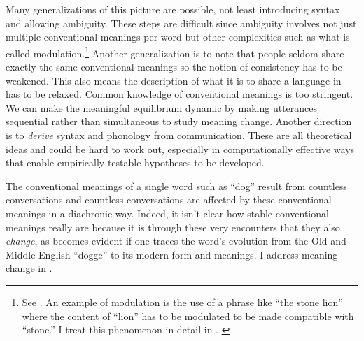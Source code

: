 
Many generalizations of this picture are possible, not least introducing syntax and allowing ambiguity. These steps are difficult since ambiguity involves not just multiple conventional meanings per word but other complexities such as what is called modulation.\footnote{See \citet{cohen:pa, cohen:ci}. An example of modulation is the use of a phrase like ``the stone lion'' where the content of ``lion'' has to be modulated to be made compatible with ``stone.'' I treat this phenomenon in detail in . \label{foot:modulation}} Another generalization is to note that people seldom share exactly the same conventional meanings so the notion of consistency has to be weakened. This also means the description of what it is to share a language in  has to be relaxed. Common knowledge of conventional meanings is too stringent. We can make the meaningful equilibrium dynamic by making utterances sequential rather than simultaneous to study meaning change. Another direction is to \emph{derive} syntax and phonology from communication. These are all theoretical ideas and could be hard to work out, especially in computationally effective ways that enable empirically testable hypotheses to be developed.

The conventional meanings of a single word such as ``dog'' result from countless conversations and countless conversations are affected by these conventional meanings in a diachronic way. Indeed, it isn't clear how stable conventional meanings really are because it is through these very encounters that they also \emph{change}, as becomes evident if one traces the word's evolution from the Old and Middle English ``dogge'' to its modern form and meanings. I address meaning change in .

